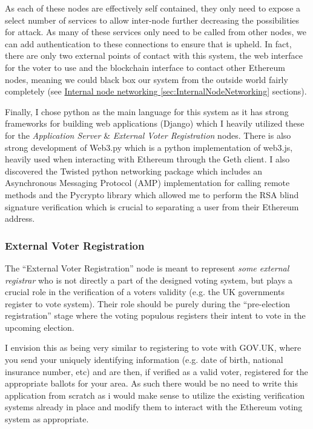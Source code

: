 \documentclass{article}
\begin{document}
As each of these nodes are effectively self contained, they only need to expose a select number of services to allow inter-node further decreasing the possibilities for attack. As many of these services only need to be called from other nodes, we can add authentication to these connections to ensure that is upheld. In fact, there are only two external points of contact with this system, the web interface for the voter to use and the blockchain interface to contact other Ethereum nodes, meaning we could black box our system from the outside world fairly completely (see \hyperref[sec:InternalNodeNetworking]{Internal node networking \ref*{sec:InternalNodeNetworking}} sections).

Finally, I chose python as the main language for this system as it has strong frameworks for building web applications (Django) which I heavily utilized these for the \textit{Application Server} \& \textit{External Voter Registration} nodes. There is also strong development of Web3.py \citep{62_pipermerriam_web3.py_2017} which is a python implementation of web3.js, heavily used when interacting with Ethereum through the Geth client. I also discovered the Twisted python networking package \citep{63_twisted_2017} which includes an Asynchronous Messaging Protocol (AMP) implementation for calling remote methods and the Pycrypto library which allowed me to perform the RSA blind signature verification which is crucial to separating a user from their Ethereum address.

\subsubsection{External Voter Registration}
The ``External Voter Registration'' node is meant to represent \textit{some external registrar} who is not directly a part of the designed voting system, but plays a crucial role in the verification of a voters validity (e.g. the UK governments register to vote system). Their role should be purely during the ``pre-election registration'' stage where the voting populous registers their intent to vote in the upcoming election. 

I envision this as being very similar to registering to vote with GOV.UK, where you send your uniquely identifying information (e.g. date of birth, national insurance number, etc) and are then, if verified as a valid voter, registered for the appropriate ballots for your area. As such there would be no need to write this application from scratch as i would make sense to utilize the existing verification systems already in place and modify them to interact with the Ethereum voting system as appropriate. 
\end{document}
